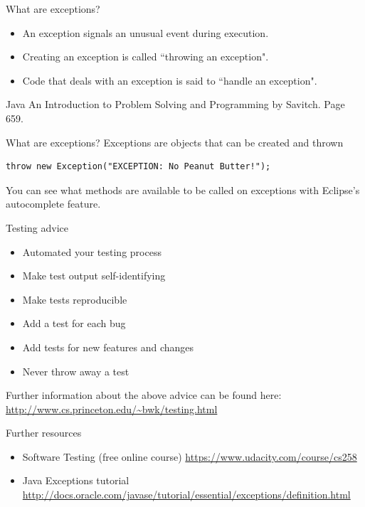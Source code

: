 \documentclass{beamer}
\begin{document}
\begin{frame}[fragile]{ What are exceptions?}
\begin{itemize}
\item An exception signals an unusual event during execution.
\item Creating an exception is called ``throwing an exception".
\item Code that deals with an exception is said to ``handle an exception".
\end{itemize}
\small
Java An Introduction to Problem Solving and Programming by Savitch. Page 659.
\end{frame}


\begin{frame}[fragile]{ What are exceptions?}
Exceptions are objects that can be created and thrown
\begin{lstlisting}
throw new Exception("EXCEPTION: No Peanut Butter!");
\end{lstlisting}
You can see what methods are available to be called on exceptions with Eclipse's autocomplete feature.
\end{frame}


\begin{frame}[fragile]{ Testing advice}
\begin{itemize}
\item Automated your testing process
\item Make test output self-identifying
\item Make tests reproducible
\item Add a test for each bug
\item Add tests for new features and changes
\item Never throw away a test
\end{itemize}
\normalsize
Further information about the above advice can be found here: \url{http://www.cs.princeton.edu/~bwk/testing.html}
\end{frame}


\begin{frame}[fragile]{ Further resources}
\begin{itemize}
\item Software Testing (free online course) \normalsize \url{https://www.udacity.com/course/cs258} \LARGE
\item Java Exceptions tutorial \normalsize \url{http://docs.oracle.com/javase/tutorial/essential/exceptions/definition.html} \LARGE
\end{itemize}
\end{frame}
\end{document}
